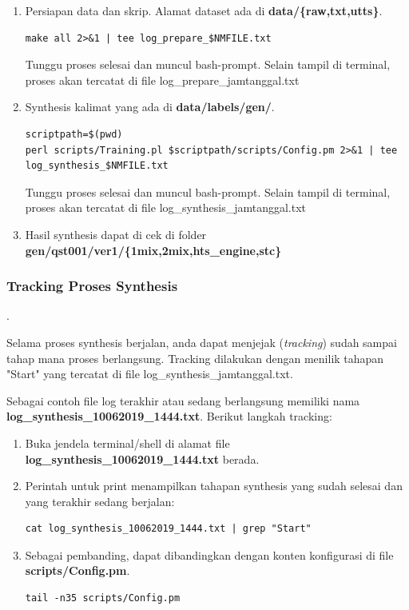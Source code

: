 \documentclass[12pt,]{article}
\begin{document}
\begin{enumerate}
		\item Persiapan data dan skrip.
		Alamat dataset ada di \textbf{data/\{raw,txt,utts\}}.
		\begin{verbatim}
make all 2>&1 | tee log_prepare_$NMFILE.txt
		\end{verbatim}
		
		Tunggu proses selesai dan muncul bash-prompt.
		Selain tampil di terminal, proses akan tercatat di file log\_prepare\_jamtanggal.txt

		\item Synthesis kalimat yang ada di \textbf{data/labels/gen/}.
		\begin{verbatim}
scriptpath=$(pwd)
perl scripts/Training.pl $scriptpath/scripts/Config.pm 2>&1 | tee log_synthesis_$NMFILE.txt
		\end{verbatim}
		
		Tunggu proses selesai dan muncul bash-prompt.
		Selain tampil di terminal, proses akan tercatat di file log\_synthesis\_jamtanggal.txt
		
		\item Hasil synthesis dapat di cek di folder \textbf{gen/qst001/ver1/\{1mix,2mix,hts\_engine,stc\}}
		
	\end{enumerate}
	
	\newpage
	\subsubsection{Tracking Proses Synthesis}.
	
	Selama proses synthesis berjalan, anda dapat menjejak (\textit{tracking}) sudah sampai tahap mana proses berlangsung.
	Tracking dilakukan dengan menilik tahapan "Start" yang tercatat di file log\_synthesis\_jamtanggal.txt.
	
	Sebagai contoh file log terakhir atau sedang berlangsung memiliki nama \textbf{log\_synthesis\_10062019\_1444.txt}.
	Berikut langkah tracking:
	
	\begin{enumerate}
		\item Buka jendela terminal/shell di alamat file \textbf{log\_synthesis\_10062019\_1444.txt} berada.
		
		\item Perintah untuk print menampilkan tahapan synthesis yang sudah selesai dan yang terakhir sedang berjalan:
		\begin{verbatim}
cat log_synthesis_10062019_1444.txt | grep "Start"
		\end{verbatim}

		\item Sebagai pembanding, dapat dibandingkan dengan konten konfigurasi di file \textbf{scripts/Config.pm}.
		\begin{verbatim}
tail -n35 scripts/Config.pm
		\end{verbatim}
		
	\end{enumerate}
\end{document}

